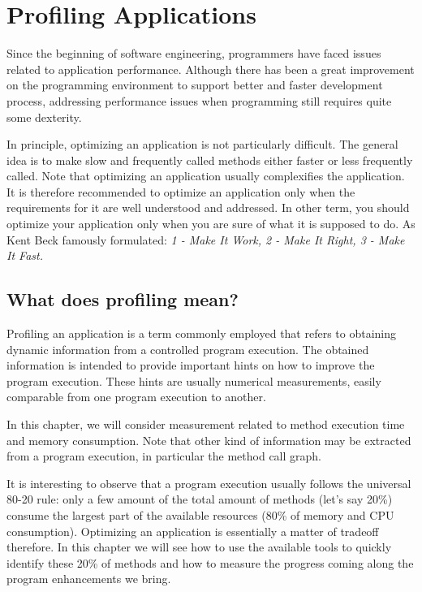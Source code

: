\documentclass[a4paper,10pt,twoside]{book}
\begin{document}


\chapter{Profiling Applications}

\indent

Since the beginning of software engineering, programmers have faced issues related to application performance. Although there has been a great improvement on the programming environment to support better and faster development process, addressing performance issues when programming still requires quite some dexterity.

In principle, optimizing an application is not particularly difficult. The general idea is to make slow and frequently called methods either faster or less frequently called. Note that optimizing an application usually complexifies the application. It is therefore recommended to optimize an application only when the requirements for it are well understood and addressed. In other term, you should optimize your application only when you are sure of what it is supposed to do. As Kent Beck famously formulated: \emph{1 - Make It Work, 2 - Make It Right, 3 - Make It Fast.}

\section{What does profiling mean?} 
Profiling an application is a term commonly employed that refers to obtaining dynamic information from a controlled program execution. The obtained information is intended to provide important hints on how to improve the program execution. These hints are usually numerical measurements, easily comparable from one program execution to another.

In this chapter, we will consider measurement related to method execution time and memory consumption. Note that other kind of information may be extracted from a program execution, in particular the method call graph.

It is interesting to observe that a program execution usually follows the universal 80-20 rule: only a few amount of the total amount of methods (let's say 20\%) consume the largest part of the available resources (80\% of memory and CPU consumption). Optimizing an application is essentially a matter of tradeoff therefore. In this chapter we will see how to use the available tools to quickly identify these 20\% of methods and how to measure the progress coming along the program enhancements we bring.
\end{document}

